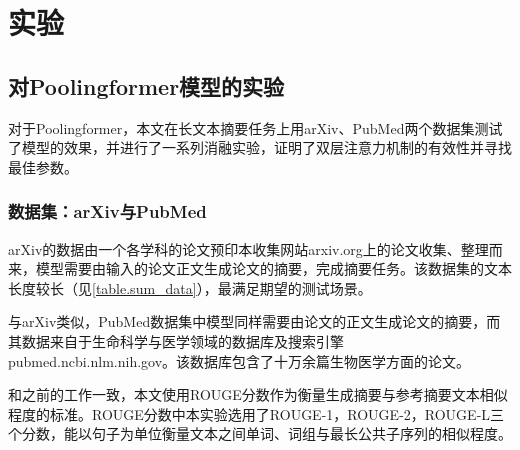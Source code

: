 \chapter{实验}

\section{对Poolingformer模型的实验}

对于Poolingformer，本文在长文本摘要任务上用arXiv、PubMed\cite{cohan2018discourse}两个数据集测试了模型的效果，并进行了一系列消融实验，证明了双层注意力机制的有效性并寻找最佳参数。

\subsection{数据集：arXiv与PubMed}

\begin{table}[h]
\caption{arXiv与PubMed数据集的相关数据}
\label{table.sum_data}
\begin{center}
\end{center}
\end{table}

arXiv的数据由一个各学科的论文预印本收集网站arxiv.org上的论文收集、整理而来\cite{cohan2018discourse}，模型需要由输入的论文正文生成论文的摘要，完成摘要任务。该数据集的文本长度较长（见\autoref{table.sum_data}），最满足期望的测试场景。

与arXiv类似，PubMed数据集中模型同样需要由论文的正文生成论文的摘要，而其数据来自于生命科学与医学领域的数据库及搜索引擎pubmed.ncbi.nlm.nih.gov。该数据库包含了十万余篇生物医学方面的论文。

和之前的工作一致，本文使用ROUGE分数\cite{lin2004rouge}作为衡量生成摘要与参考摘要文本相似程度的标准。ROUGE分数中本实验选用了ROUGE-1，ROUGE-2，ROUGE-L三个分数，能以句子为单位衡量文本之间单词、词组与最长公共子序列的相似程度。

